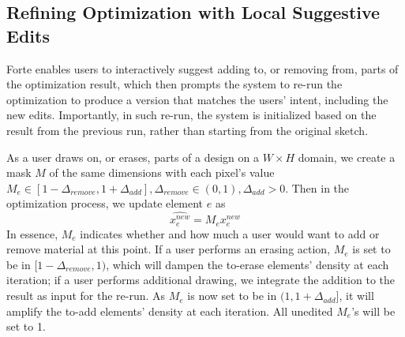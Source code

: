 

\subsection{Refining Optimization with Local Suggestive Edits}
Forte enables users to interactively suggest adding to, or removing from, parts of the optimization result, which then prompts the system to re-run the optimization to produce a version that matches the users' intent, including the new edits. Importantly, in such re-run, the system is initialized based on the result from the previous run, rather than starting from the original sketch.

As a user draws on, or erases, parts of a design on a $W \times H$ domain, we create a mask $M$ of the same dimensions with each pixel's value $M_e \in [1-\Delta_{remove}, 1+\Delta_{add}], \Delta_{remove} \in (0, 1), \Delta_{add} > 0$. Then in the optimization process, we update element $e$ as
\begin{equation}
\widehat {x_e^{new}}=M_e x_e^{new}
\end{equation}
In essence, $M_e$ indicates whether and how much a user would want to add or remove material at this point.
If a user performs an erasing action, $M_e$ is set to be in $[1-\Delta_{remove}, 1)$, which will dampen the to-erase elements' density at each iteration; if a user performs additional drawing, we integrate the addition to the result as input for the re-run. As $M_e$ is now set to be in $(1, 1+\Delta_{add}]$, it will amplify the to-add elements' density at each iteration. All unedited $M_e$'s will be set to 1.


